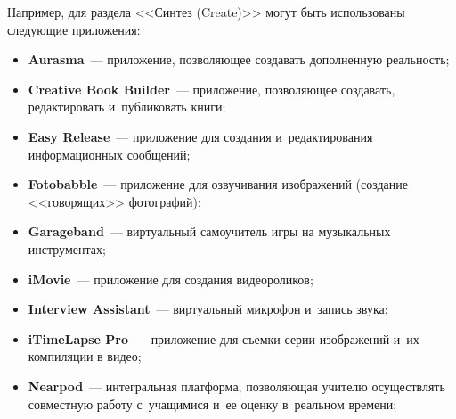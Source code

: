 \begin{multicols}{2}
  Например, для раздела <<Синтез (Create)>> могут быть использованы следующие
приложения:
  \begin{itemize}
\item \textbf{Aurasma}~--- приложение, позволяющее создавать дополненную реальность;
\item \textbf{Creative Book Builder}~--- приложение, позволяющее создавать, редактировать и~публиковать книги;
\item \textbf{Easy Release}~--- приложение для создания и~редактирования информационных
сообщений;
\item \textbf{Fotobabble}~--- приложение для озвучивания изображений
(создание <<говорящих>> фотографий);
\item \textbf{Garageband}~--- виртуальный самоучитель игры на музыкальных инструментах;
\item \textbf{iMovie}~--- приложение для создания видеороликов;
\item \textbf{Interview Assistant}~--- виртуальный микрофон и~запись звука;
\item \textbf{iTimeLapse Pro}~--- приложение для съемки серии изображений и~их компиляции
в видео;
\item \textbf{Nearpod}~--- интегральная платформа, поз\-во\-ля\-ющая учителю осуществлять
совместную работу с~учащимися и~ее оценку в~реальном времени;
\end{itemize}

\end{multicols}

